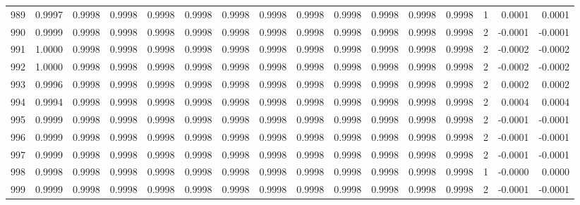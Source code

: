 \begin{tabular}{lrrrrrrrrrrrrrrr}
989 &      0.9997 &  0.9998 &  0.9998 &  0.9998 &  0.9998 &  0.9998 &  0.9998 &  0.9998 &  0.9998 &  0.9998 &   0.9998 &     0.9998 &      1 &                    0.0001 &                     0.0001 \\
990 &      0.9999 &  0.9998 &  0.9998 &  0.9998 &  0.9998 &  0.9998 &  0.9998 &  0.9998 &  0.9998 &  0.9998 &   0.9998 &     0.9998 &      2 &                   -0.0001 &                    -0.0001 \\
991 &      1.0000 &  0.9998 &  0.9998 &  0.9998 &  0.9998 &  0.9998 &  0.9998 &  0.9998 &  0.9998 &  0.9998 &   0.9998 &     0.9998 &      2 &                   -0.0002 &                    -0.0002 \\
992 &      1.0000 &  0.9998 &  0.9998 &  0.9998 &  0.9998 &  0.9998 &  0.9998 &  0.9998 &  0.9998 &  0.9998 &   0.9998 &     0.9998 &      2 &                   -0.0002 &                    -0.0002 \\
993 &      0.9996 &  0.9998 &  0.9998 &  0.9998 &  0.9998 &  0.9998 &  0.9998 &  0.9998 &  0.9998 &  0.9998 &   0.9998 &     0.9998 &      2 &                    0.0002 &                     0.0002 \\
994 &      0.9994 &  0.9998 &  0.9998 &  0.9998 &  0.9998 &  0.9998 &  0.9998 &  0.9998 &  0.9998 &  0.9998 &   0.9998 &     0.9998 &      2 &                    0.0004 &                     0.0004 \\
995 &      0.9999 &  0.9998 &  0.9998 &  0.9998 &  0.9998 &  0.9998 &  0.9998 &  0.9998 &  0.9998 &  0.9998 &   0.9998 &     0.9998 &      2 &                   -0.0001 &                    -0.0001 \\
996 &      0.9999 &  0.9998 &  0.9998 &  0.9998 &  0.9998 &  0.9998 &  0.9998 &  0.9998 &  0.9998 &  0.9998 &   0.9998 &     0.9998 &      2 &                   -0.0001 &                    -0.0001 \\
997 &      0.9999 &  0.9998 &  0.9998 &  0.9998 &  0.9998 &  0.9998 &  0.9998 &  0.9998 &  0.9998 &  0.9998 &   0.9998 &     0.9998 &      2 &                   -0.0001 &                    -0.0001 \\
998 &      0.9998 &  0.9998 &  0.9998 &  0.9998 &  0.9998 &  0.9998 &  0.9998 &  0.9998 &  0.9998 &  0.9998 &   0.9998 &     0.9998 &      1 &                   -0.0000 &                     0.0000 \\
999 &      0.9999 &  0.9998 &  0.9998 &  0.9998 &  0.9998 &  0.9998 &  0.9998 &  0.9998 &  0.9998 &  0.9998 &   0.9998 &     0.9998 &      2 &                   -0.0001 &                    -0.0001 \\
\bottomrule
\end{tabular}
